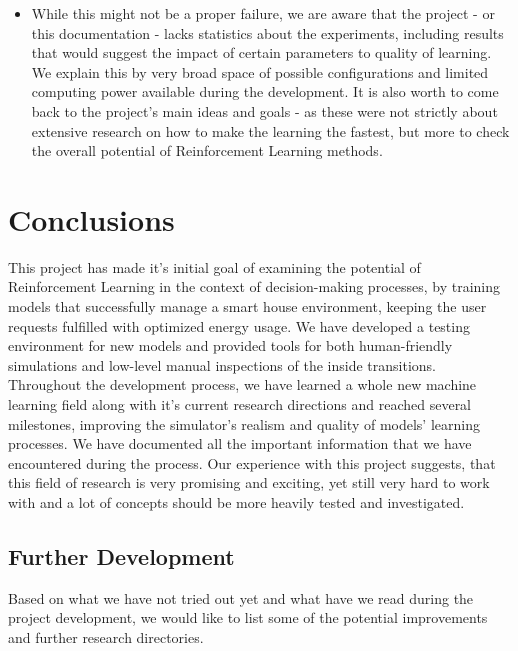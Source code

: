 \documentclass{article}
\begin{document}
\begin{itemize}
\item While this might not be a proper failure, we are aware that the project - or this documentation - lacks statistics about the experiments, including results that would suggest the impact of certain parameters to quality of learning. We explain this by very broad space of possible configurations and limited computing power available during the development. It is also worth to come back to the project's main ideas and goals - as these were not strictly about extensive research on how to make the learning the fastest, but more to check the overall potential of Reinforcement Learning methods. 
\end{itemize}

\section{Conclusions}

This project has made it's initial goal of examining the potential of Reinforcement Learning in the context of decision-making processes, by training models that successfully manage a smart house environment, keeping the user requests fulfilled with optimized energy usage. We have developed a testing environment for new models and provided tools for both human-friendly simulations and low-level manual inspections of the inside transitions. Throughout the development process, we have learned a whole new machine learning field along with it's current research directions and reached several milestones, improving the simulator's realism and quality of models' learning processes. We have documented all the important information that we have encountered during the process. Our experience with this project suggests, that this field of research is very promising and exciting, yet still very hard to work with and a lot of concepts should be more heavily tested and investigated.
\subsection{Further Development}
Based on what we have not tried out yet and what have we read during the project development, we would like to list some of the potential improvements and further research directories.
\end{document}
